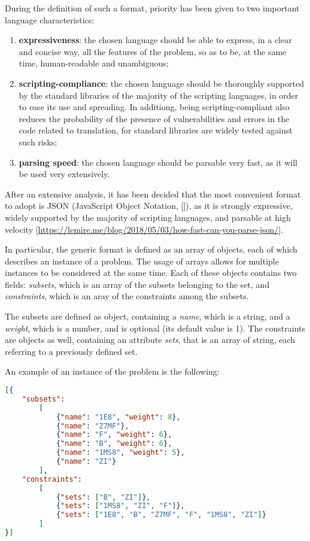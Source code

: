 \documentclass[oneside,a4paper]{article}
\begin{document}
During the definition of such a format, priority has been given to two important language characteristics:
\begin{enumerate}
    \item \textbf{expressiveness}: the chosen language should be able to express, in a clear and concise way, all the features of the problem, so as to be, at the same time, human-readable and unambiguous;
    \item \textbf{scripting-compliance}: the chosen language should be thoroughly supported by the standard libraries of the majority of the scripting languages, in order to ease its use and spreading. In additiong, being scripting-compliant also reduces the probability of the presence of vulnerabilities and errors in the code related to translation, for standard libraries are widely tested against such risks;
    \item \textbf{parsing speed}: the chosen language should be parsable very fast, as it will be used very extensively.
\end{enumerate}
After an extensive analysis, it has been decided that the most convenient format to adopt is JSON (JavaScript Object Notation, []), as it is strongly expressive, widely supported by the majority of scripting languages, and parsable at high velocity [\url{https://lemire.me/blog/2018/05/03/how-fast-can-you-parse-json/}].

In particular, the generic format is defined as an array of objects, each of which describes an instance of a problem. The usage of arrays allows for multiple instances to be considered at the same time. Each of these objects contains two fields: \textit{subsets}, which is an array of the subsets belonging to the set, and \textit{constraints}, which is an aray of the constraints among the subsets. 

The subsets are defined as object, containing a \textit{name}, which is a string, and a \textit{weight}, which is a number, and is optional (its default value is 1). The constraints are objects as well, containing an attribute \textit{sets}, that is an array of string, each referring to a previously defined set.

An example of an instance of the problem is the following: 

\begin{lstlisting}[language=json,firstnumber=1]
[{
    "subsets": 
        [
            {"name": "1E8", "weight": 8},
            {"name": "Z7MF"},
            {"name": "F", "weight": 6},
            {"name": "B", "weight": 6},
            {"name": "1MS8", "weight": 5},
            {"name": "ZI"}
        ],
    "constraints":
        [
            {"sets": ["B", "ZI"]},
            {"sets": ["1MS8", "ZI", "F"]},
            {"sets": ["1E8", "B", "Z7MF", "F", "1MS8", "ZI"]}
        ]
}]
\end{lstlisting}
\end{document}
